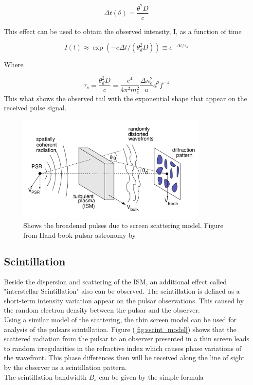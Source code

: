 \begin{equation}
\label{g delay}
\Delta t(\theta) = \frac{\theta^2 D}{c}
\end{equation}

This effect can be used to obtain the observed intensity, I, as a function of time

\begin{equation}
\label{obs-intinsity}
I(t) \approx \exp(-c \Delta t/(\theta^2_d D)) \equiv e^{-\Delta t/\tau_s}
\end{equation}

Where

\begin{equation}
\label{tau}
\tau_s = \frac{\theta^2_d D}{c} = \frac{e^4}{4 \pi^2 m^2_e} \frac{\Delta n^2_e}{a} d^2 f^{-4}
\end{equation}
This what shows the observed tail with the exponential shape that appear on the received pulse signal. 


\begin{figure}[H] 
\centering    
\includegraphics[width=0.85\textwidth]{PSRs_thin_screen.png}
\caption[The de-dispersion]{Shows the broadened pulses due to screen scattering model.
Figure from Hand book pulsar astronomy by \citet{lorimer2005handbook} }
\label{fig:scut_model}
\end{figure}


\subsection{Scintillation}
Beside the dispersion and scattering of the ISM, an additional effect called "interstellar Scintillation" also can be observed. The scintillation is defined as a short-term intensity variation appear on the pulsar observations. This caused by the random electron density between the pulsar and the observer.\\
Using a similar model of the scattering, the thin screen model can be used for analysis
of the pulsars scintillation. Figure (\ref{fig:sscint_model}) shows that the scattered radiation from the pulsar to an observer presented in a thin screen leads to random irregularities in the refractive index which causes phase variations of the wavefront. This phase differences then will be received along the line of sight by the observer as a scintillation pattern.\\
The scintillation bandwidth $B_{s}$ can be given by the simple formula


